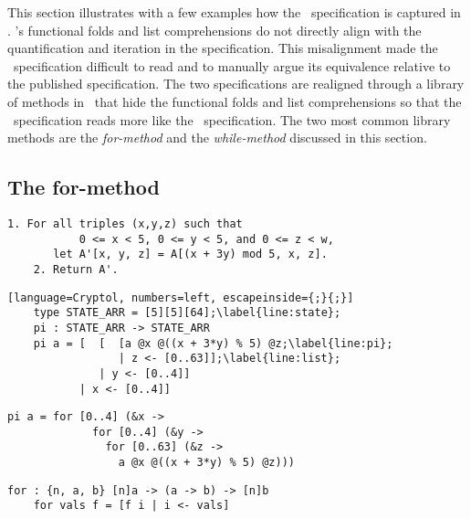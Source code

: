 This section illustrates with a few examples how the \fips\ specification is captured in \cryptol. 
\cryptol's functional folds and list comprehensions do not directly align with the quantification and iteration in the specification. 
This misalignment made the \cryptol\ specification difficult to read and to manually argue its equivalence relative to the published specification.
The two specifications are realigned through a library of methods in \cryptol\ that hide the functional folds and list comprehensions so that the \cryptol\ specification reads more like the \fips\ specification. The two most common library methods are the \emph{for-method} and the \emph{while-method} discussed in this section.

\subsection{The for-method}

\newsavebox{\fipsPi}
\begin{lrbox}{\fipsPi}
  \begin{lstlisting}[basewidth = {.5em},basicstyle={\small}]
    1. For all triples (x,y,z) such that 
           0 <= x < 5, 0 <= y < 5, and 0 <= z < w,
       let A'[x, y, z] = A[(x + 3y) mod 5, x, z].
    2. Return A'.
  \end{lstlisting}
\end{lrbox}

\newsavebox{\PiCry}
\begin{lrbox}{\PiCry}
  \begin{lstlisting}[language=Cryptol, numbers=left, escapeinside={;}{;}]
    type STATE_ARR = [5][5][64];\label{line:state};
    pi : STATE_ARR -> STATE_ARR
    pi a = [  [  [a @x @((x + 3*y) % 5) @z;\label{line:pi};
                 | z <- [0..63]];\label{line:list};
              | y <- [0..4]] 
           | x <- [0..4]]
  \end{lstlisting}
\end{lrbox}

\newsavebox{\PiCryLib}
\begin{lrbox}{\PiCryLib}
  \begin{lstlisting}[language=Cryptol]
    pi a = for [0..4] (&x ->
             for [0..4] (&y -> 
               for [0..63] (&z -> 
                 a @x @((x + 3*y) % 5) @z)))
  \end{lstlisting}
\end{lrbox}

\newsavebox{\formethod}
\begin{lrbox}{\formethod}
  \begin{lstlisting}[language=Cryptol]
    for : {n, a, b} [n]a -> (a -> b) -> [n]b
    for vals f = [f i | i <- vals]
  \end{lstlisting}
\end{lrbox}

